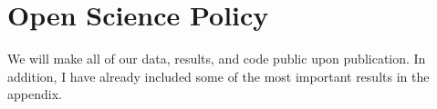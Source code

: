 \clearpage


\section*{Open Science Policy}

We will make all of our data, results, and code public upon
publication. In addition, I have already included some of the most
important results in the appendix.


